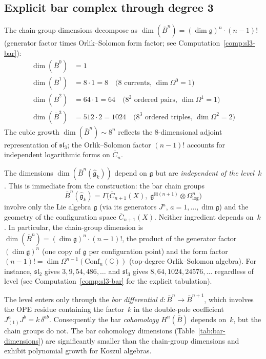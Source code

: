 \subsection{Explicit bar complex through degree 3}

\begin{computation}\label{comp:sl3-bar-dimensions}
The chain-group dimensions decompose as
$\dim(\bar{B}^n) = (\dim\mathfrak{g})^n \cdot (n-1)!$
(generator factor times Orlik--Solomon form factor;
see Computation~\ref{comp:sl3-bar}):
\begin{align}
\dim(\bar{B}^0) &= 1 \\
\dim(\bar{B}^1) &= 8 \cdot 1 = 8
  \quad \text{($8$ currents, $\dim\Omega^0 = 1$)} \\
\dim(\bar{B}^2) &= 64 \cdot 1 = 64
  \quad \text{($8^2$ ordered pairs, $\dim\Omega^1 = 1$)} \\
\dim(\bar{B}^3) &= 512 \cdot 2 = 1024
  \quad \text{($8^3$ ordered triples, $\dim\Omega^2 = 2$)}
\end{align}
The cubic growth $\dim(\bar{B}^n) \sim 8^n$ reflects the $8$-dimensional adjoint representation of $\mathfrak{sl}_3$; the Orlik--Solomon factor $(n-1)!$ accounts for independent logarithmic forms on $\overline{C}_n$.
\end{computation}

\begin{lemma}%
\label{lem:bar-dims-level-independent}
The dimensions $\dim(\bar{B}^n(\widehat{\mathfrak{g}}_k))$ depend on
$\mathfrak{g}$ but are \emph{independent of the level~$k$}.  This is
immediate from the construction: the bar chain groups
\[
\bar{B}^n(\widehat{\mathfrak{g}}_k)
= \Gamma\!\bigl(\overline{C}_{n+1}(X),\;
  \mathfrak{g}^{\boxtimes(n+1)} \otimes \Omega^n_{\log}\bigr)
\]
involve only the Lie algebra $\mathfrak{g}$ (via its generators
$J^a$, $a = 1, \ldots, \dim\mathfrak{g}$) and the geometry of the
configuration space $\overline{C}_{n+1}(X)$.  Neither ingredient
depends on~$k$.  In particular, the chain-group dimension
is $\dim(\bar{B}^n) = (\dim\mathfrak{g})^n \cdot (n-1)!$,
the product of the generator factor $(\dim\mathfrak{g})^n$
(one copy of $\mathfrak{g}$ per configuration point) and
the form factor $(n-1)! = \dim\Omega^{n-1}(\mathrm{Conf}_n(\mathbb{C}))$
(top-degree Orlik--Solomon algebra).  For instance,
$\mathfrak{sl}_2$ gives $3, 9, 54, 486, \ldots$ and
$\mathfrak{sl}_3$ gives $8, 64, 1024, 24576, \ldots$ regardless of
level (see Computation~\ref{comp:sl3-bar} for the
explicit tabulation).

The level enters only through the \emph{bar differential}
$d\colon \bar{B}^n \to \bar{B}^{n+1}$, which involves the OPE
residue containing the factor~$k$ in the double-pole coefficient
$J^a_{(1)}J^b = k\,\delta^{ab}$.  Consequently the bar
\emph{cohomology} $H^n(\bar{B})$ depends on~$k$, but the chain
groups do not.  The bar cohomology dimensions
(Table~\ref{tab:bar-dimensions}) are significantly smaller
than the chain-group dimensions and exhibit polynomial growth
for Koszul algebras.
\end{lemma}

